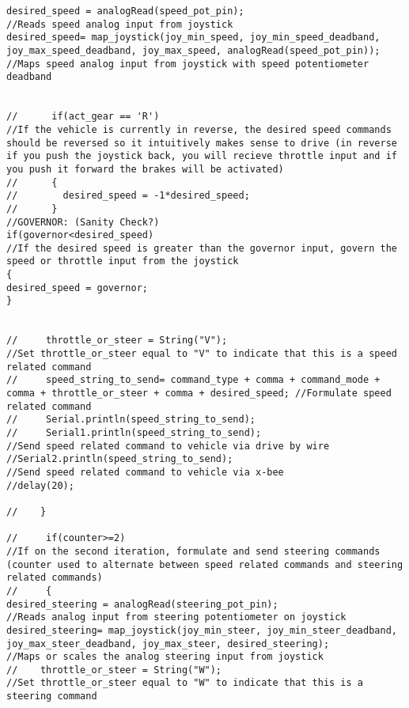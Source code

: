\begin{lstlisting}[breaklines=true,basicstyle=\tiny]
desired_speed = analogRead(speed_pot_pin);                                        //Reads speed analog input from joystick
desired_speed= map_joystick(joy_min_speed, joy_min_speed_deadband, joy_max_speed_deadband, joy_max_speed, analogRead(speed_pot_pin));                     //Maps speed analog input from joystick with speed potentiometer deadband


//      if(act_gear == 'R')                                                              //If the vehicle is currently in reverse, the desired speed commands should be reversed so it intuitively makes sense to drive (in reverse if you push the joystick back, you will recieve throttle input and if you push it forward the brakes will be activated)
//      {
//        desired_speed = -1*desired_speed;
//      }
//GOVERNOR: (Sanity Check?)
if(governor<desired_speed)                                                        //If the desired speed is greater than the governor input, govern the speed or throttle input from the joystick 
{
desired_speed = governor;
}


//     throttle_or_steer = String("V");                                                  //Set throttle_or_steer equal to "V" to indicate that this is a speed related command
//     speed_string_to_send= command_type + comma + command_mode + comma + throttle_or_steer + comma + desired_speed; //Formulate speed related command
//     Serial.println(speed_string_to_send);
//     Serial1.println(speed_string_to_send);                                            //Send speed related command to vehicle via drive by wire
//Serial2.println(speed_string_to_send);                                            //Send speed related command to vehicle via x-bee
//delay(20);

//    }

//     if(counter>=2)                                                                    //If on the second iteration, formulate and send steering commands (counter used to alternate between speed related commands and steering related commands)
//     {
desired_steering = analogRead(steering_pot_pin);                                  //Reads analog input from steering potentiometer on joystick
desired_steering= map_joystick(joy_min_steer, joy_min_steer_deadband, joy_max_steer_deadband, joy_max_steer, desired_steering);               //Maps or scales the analog steering input from joystick
//    throttle_or_steer = String("W");                                                  //Set throttle_or_steer equal to "W" to indicate that this is a steering command


\end{lstlisting}
